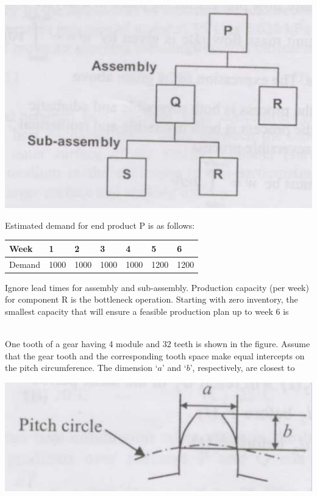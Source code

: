 \documentclass[addpoints,11pt]{exam}
\begin{document}
\begin{questions}
    \begin{center}
        \includegraphics[scale=0.3]{q61}
    \end{center}
    Estimated demand for end product P is as follows:\\
    \begin{center}
        \begin{tabular}{|l|l|l|l|l|l|l|}
            \hline
            Week & 1 & 2 & 3 & 4 & 5 & 6\\\hline
            Demand & 1000 & 1000 & 1000 & 1000 & 1200 & 1200\\\hline
        \end{tabular}
    \end{center}
    Ignore lead  times for assembly and sub-assembly. Production capacity (per week) for component R is the bottleneck operation. Starting with zero inventory, the smallest capacity that will ensure a feasible production plan up to week 6 is

    \begin{oneparchoices}
    \end{oneparchoices}\\

    \question One tooth of a gear having 4 module and 32 teeth is shown in the figure. Assume that the gear tooth and the corresponding tooth space make equal intercepts on the pitch circumference. The dimension `$a$' and `$b$', respectively, are closest to
    
    \begin{center}
        \includegraphics[scale=0.3]{q62}
    \end{center}


\end{questions}
\end{document}
